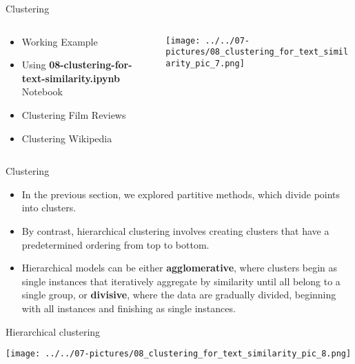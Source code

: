 \documentclass[11pt]{beamer}
\begin{document}
\begin{frame}{Clustering}
\begin{columns}[T] %
\begin{column}{.48\textwidth}
        \begin{itemize}
		\item Working Example
		\item Using \textbf{08-clustering-for-text-similarity.ipynb} Notebook 
		\item Clustering Film Reviews
		\item Clustering Wikipedia
        \end{itemize}
\end{column}%
\hfill%
\begin{column}{.48\textwidth}
        \texttt{[image: ../../07-pictures/08\_clustering\_for\_text\_similarity\_pic\_7.png]}
\end{column}%
\end{columns}
\end{frame}
\begin{frame}{Clustering}
	\begin{itemize}
		\item In the previous section, we explored partitive methods, which divide points into clusters. 
		\item By contrast, hierarchical clustering involves creating clusters that have a predetermined ordering from top to bottom. 
		\item Hierarchical models can be either \textbf{agglomerative}, where clusters begin as single instances that iteratively aggregate by similarity until all belong to a single group, or \textbf{divisive}, where the data are gradually divided, beginning with all instances and finishing as single instances.
	\end{itemize}
\end{frame}
\begin{frame}{Hierarchical clustering}
	\begin{center}
	\texttt{[image: ../../07-pictures/08\_clustering\_for\_text\_similarity\_pic\_8.png]}
	\end{center}
\end{frame}
\end{document}
